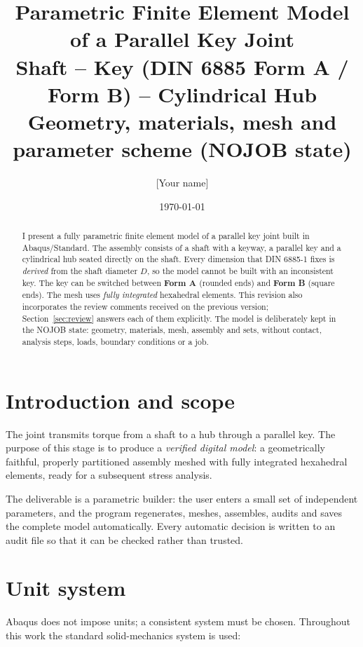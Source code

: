 \documentclass[11pt,a4paper]{article}
\title{\textbf{Parametric Finite Element Model of a Parallel Key Joint}\\[4pt]
\large Shaft -- Key (DIN 6885 Form A / Form B) -- Cylindrical Hub\\
Geometry, materials, mesh and parameter scheme (NOJOB state)}
\author{[Your name]}
\date{\today}
\begin{document}
\maketitle

\begin{abstract}
\noindent
I present a fully parametric finite element model of a parallel key joint built
in Abaqus/Standard. The assembly consists of a shaft with a keyway, a parallel
key and a cylindrical hub seated directly on the shaft. Every dimension that
DIN 6885-1 fixes is \emph{derived} from the shaft diameter $D$, so the model
cannot be built with an inconsistent key. The key can be switched between
\textbf{Form A} (rounded ends) and \textbf{Form B} (square ends). The mesh uses
\emph{fully integrated} hexahedral elements. This revision also incorporates the
review comments received on the previous version; Section~\ref{sec:review}
answers each of them explicitly. The model is deliberately kept in the NOJOB
state: geometry, materials, mesh, assembly and sets, without contact, analysis
steps, loads, boundary conditions or a job.
\end{abstract}

\tableofcontents
\bigskip

\section{Introduction and scope}
The joint transmits torque from a shaft to a hub through a parallel key. The
purpose of this stage is to produce a \emph{verified digital model}: a
geometrically faithful, properly partitioned assembly meshed with fully
integrated hexahedral elements, ready for a subsequent stress analysis.

The deliverable is a parametric builder: the user enters a small set of
independent parameters, and the program regenerates, meshes, assembles, audits
and saves the complete model automatically. Every automatic decision is written
to an audit file so that it can be checked rather than trusted.

\section{Unit system}
Abaqus does not impose units; a consistent system must be chosen. Throughout
this work the standard solid-mechanics system is used:
\end{document}
